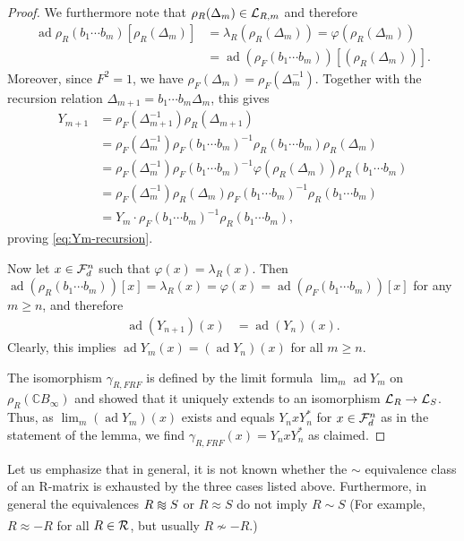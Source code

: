 \documentclass[12pt,a4paper]{amsart}
\numberwithin{equation}{section}
\theoremstyle{remark}
\DeclareMathOperator{\ad}{ad}
\newcommand{\Cl}{\mathbb{C}}
\newcommand{\la}{\lambda}
\def\apeqA{\SavedStyle\sim}
\def\Msim{\setstackgap{L}{\dimexpr.5pt+1.5\LMpt}\ensurestackMath{%
  \ThisStyle{\mathrel{\Centerstack{{\apeqA} {\apeqA} {\apeqA}}}}}}
\def\Nsim{\approx}
\begin{document}
\begin{description}
\begin{proof}
		We furthermore note that $\rho_R(\Delta_m)\in\mathcal{L}_{R,m}$ and therefore
		\begin{align*}
			\ad\rho_R(b_1\cdots b_m)[\rho_R(\Delta_m)]
			&=
			\la_R(\rho_R(\Delta_m))
			=
			\varphi(\rho_R(\Delta_m))
			\\
			&=\ad(\rho_F(b_1\cdots b_m))[(\rho_R(\Delta_m))].
		\end{align*}
		Moreover, since $F^2=1$, we have $\rho_F(\Delta_m)=\rho_F(\Delta_m^{-1})$. Together with the recursion relation $\Delta_{m+1}=b_1\cdots b_m\Delta_m$, this gives
		\begin{align*}
			Y_{m+1}
			&=
			\rho_F(\Delta_{m+1}^{-1})\rho_R(\Delta_{m+1})
			\\
			&=
			\rho_F(\Delta_m^{-1})\rho_F(b_1\cdots b_m)^{-1}\rho_R(b_1\cdots b_m)\rho_R(\Delta_m)
			\\
			&=
			\rho_F(\Delta_m^{-1})\rho_F(b_1\cdots b_m)^{-1}\varphi(\rho_R(\Delta_m))\rho_R(b_1\cdots b_m)
			\\
			&=
			\rho_F(\Delta_m^{-1})\rho_R(\Delta_m)\rho_F(b_1\cdots b_m)^{-1}\rho_R(b_1\cdots b_m)
			\\
			&=
			Y_m\cdot \rho_F(b_1\cdots b_m)^{-1}\rho_R(b_1\cdots b_m),
		\end{align*}
		proving \eqref{eq:Ym-recursion}.
		
		Now let $x\in\mathcal{F}_d^n$ such that $\varphi(x)=\la_R(x)$. Then $\ad(\rho_R(b_1\cdots b_m))[x]=\la_R(x)=\varphi(x)=\ad(\rho_F(b_1\cdots b_m))[x]$ for any $m\geq n$, and therefore
		\begin{align*}
			\ad(Y_{n+1})(x)
			&=
			\ad(Y_{n})(x).
		\end{align*}
		Clearly, this implies $\ad Y_m(x)=(\ad Y_n)(x)$ for all $m\geq n$.
		
		The isomorphism $\gamma_{R,FRF}$ is defined by the limit formula $\lim_m\ad Y_m$ on $\rho_R(\Cl B_\infty)$ and showed that it uniquely extends to an isomorphism $\mathcal{L}_R\to\mathcal{L}_S$. Thus, as $\lim_m(\ad Y_m)(x)$ exists and equals $Y_nxY_n^*$ for $x\in\mathcal{F}_d^n$ as in the statement of the lemma, we find $\gamma_{R,FRF}(x)=Y_nxY_n^*$ as claimed.	
	\end{proof}
\end{description}

Let us emphasize that in general, it is not known whether the $\sim$ equivalence class of an R-matrix is exhausted by the three cases listed above. Furthermore, in general the equivalences $R\Msim S$ or $R\Nsim S$ do not imply $R\sim S$ (For example, $R\Nsim-R$ for all $R\in\mathcal{R}$, but usually $R\not\sim-R$.)
\end{document}

